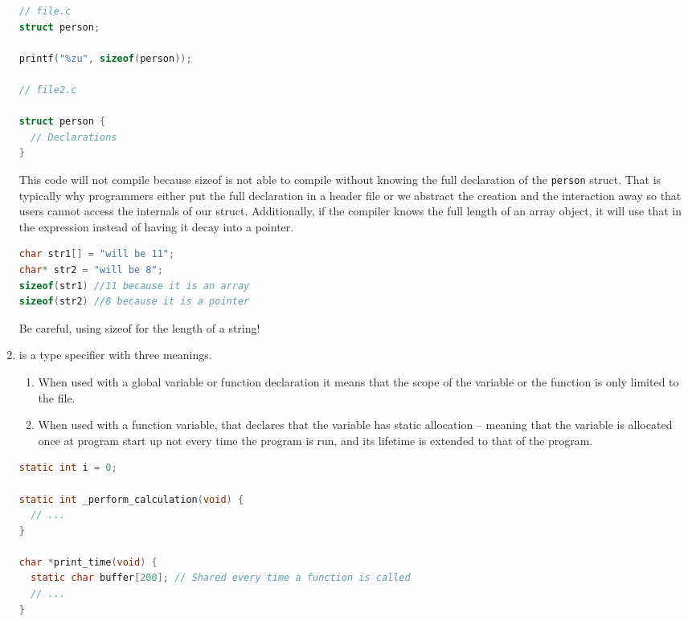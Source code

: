 \begin{enumerate}
	      \begin{lstlisting}[language=C]
// file.c
struct person;

printf("%zu", sizeof(person));

// file2.c

struct person {
  // Declarations
}
\end{lstlisting}

	      This code will not compile because sizeof is not able to compile  without knowing the full declaration of the \texttt{person} struct.
        That is typically why programmers either put the full declaration in a header file or we abstract the creation and the interaction away so that users cannot access the internals of our struct.
        Additionally, if the compiler knows the full length of an array object, it will use that in the expression instead of having it decay into a pointer.

	      \begin{lstlisting}[language=C]
char str1[] = "will be 11";
char* str2 = "will be 8";
sizeof(str1) //11 because it is an array
sizeof(str2) //8 because it is a pointer
\end{lstlisting}

	      Be careful, using sizeof for the length of a string!

	\item {} is a type specifier with three meanings.

	      \begin{enumerate}
		      \item When used with a global variable or function declaration it means that the scope of the variable or the function is only limited to the file.
		      \item When used with a function variable, that declares that the variable has static allocation -- meaning that the variable is allocated once at program start up not every time the program is run, and its lifetime is extended to that of the program.
	      \end{enumerate}

	      \begin{lstlisting}[language=C]
static int i = 0;

static int _perform_calculation(void) {
  // ...
}

char *print_time(void) {
  static char buffer[200]; // Shared every time a function is called
  // ...
}
\end{lstlisting}


\end{enumerate}
